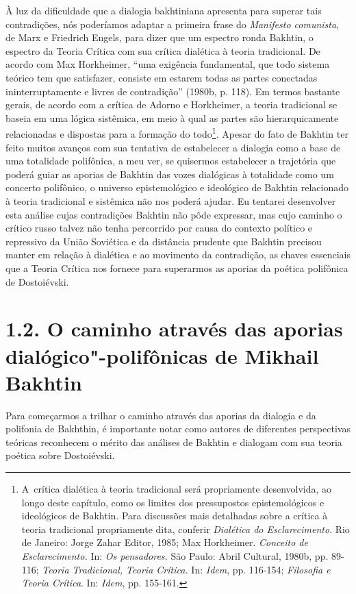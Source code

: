 {À luz da dificuldade que a dialogia bakhtiniana apresenta para superar
tais contradições, nós poderíamos adaptar a primeira frase do
\emph{Manifesto comunista}, de Marx e Friedrich Engels, para dizer que
um espectro ronda Bakhtin, o espectro da Teoria Crítica com sua crítica
dialética à teoria tradicional. De acordo com Max Horkheimer, ``uma
exigência fundamental, que todo sistema teórico tem que satisfazer,
consiste em estarem todas as partes conectadas ininterruptamente e
livres de contradição'' (1980b, p. 118). Em termos bastante gerais, de
acordo com a crítica de Adorno e Horkheimer, a teoria tradicional se
baseia em uma lógica sistêmica, em meio à qual as partes são
hierarquicamente relacionadas e dispostas para a formação do
todo\footnote{A~crítica dialética à teoria tradicional será propriamente
  desenvolvida, ao longo deste capítulo, como os limites dos
  pressupostos epistemológicos e ideológicos de Bakhtin. Para discussões
  mais detalhadas sobre a crítica à teoria tradicional propriamente
  dita, conferir \emph{Dialética do Esclarecimento}. Rio de Janeiro:
  Jorge Zahar Editor, 1985; Max Horkheimer. \emph{Conceito de
  Esclarecimento.} In: \emph{Os pensadores.} São Paulo: Abril Cultural,
  1980b, pp. 89-116; \emph{Teoria Tradicional, Teoria Crítica.} In:
  \emph{Idem}, pp. 116-154; \emph{Filosofia e Teoria Crítica}. In:
  \emph{Idem}, pp. 155-161.}. Apesar do fato de Bakhtin ter feito muitos
avanços com sua tentativa de estabelecer a dialogia como a base de uma
totalidade polifônica, a meu ver, se quisermos estabelecer a trajetória
que poderá guiar as aporias de Bakhtin das vozes dialógicas à totalidade
como um concerto polifônico, o universo epistemológico e ideológico de
Bakhtin relacionado à teoria tradicional e sistêmica não nos poderá
ajudar. Eu tentarei desenvolver esta análise cujas contradições Bakhtin
não pôde expressar, mas cujo caminho o crítico russo talvez não tenha
percorrido por causa do contexto político e repressivo da União
Soviética e da distância prudente que Bakhtin precisou manter em relação
à dialética e ao movimento da contradição, as chaves essenciais que a
Teoria Crítica nos fornece para superarmos as aporias da poética
polifônica de Dostoiévski.

\section{1.2. O caminho através das aporias dialógico"-polifônicas de Mikhail
Bakhtin}

Para começarmos a trilhar o caminho através das aporias da dialogia e da
polifonia de Bakhthin, é importante notar como autores de diferentes
perspectivas teóricas reconhecem o mérito das análises de Bakhtin e
dialogam com sua teoria poética sobre Dostoiévski.

}
